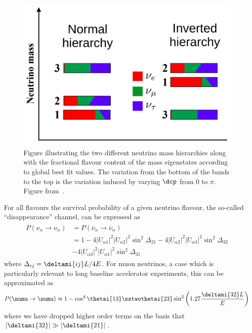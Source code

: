 \begin{figure}[h]
  \centering
  \includegraphics[width=.7\linewidth]{files/figures/theory/mh}
  \caption[Diagram of neutrino mass hierarchies.]{Figure illustrating the two different neutrino mass hierarchies along with the fractional flavour content of the mass eigenstates according to global best fit values. The variation from the bottom of the bands to the top is the variation induced by varying $\dcp$ from 0 to $\pi$. Figure from~\cite{tdrVol2}.}
  \label{fig:massHierarchy}
\end{figure}

For all flavours the survival probability of a given neutrino flavour, the so-called ``disappearance'' channel, can be expressed as~\cite{Nunokawa_2008}
\begin{align}
\begin{split}
  P(\nu_{\alpha} \rightarrow \nu_{\alpha}) &= P(\overline{\nu}_{\alpha} \rightarrow \overline{\nu}_{\alpha})\\
  &= 1 - 4|U_{\alpha 1}|^{2} |U_{\alpha 2}|^{2} \sin^{2} \Delta_{21} - 4 |U_{\alpha 2}|^{2} |U_{\alpha 3}|^{2} \sin^{2}\Delta_{32} \\ &- 4 |U_{\alpha 3}|^{2} |U_{\alpha 1}|^{2} \sin^{2} \Delta_{31}
\end{split}
\end{align}
where $\Delta_{ij}=\deltami{ij}L/4E$.
For muon neutrinos, a case which is particularly relevant to long baseline accelerator experiments, this can be approximated as
\begin{align}
  P(\numu \rightarrow \numu) \approx 1 - \cos^{4}\thetai{13} \sstwothetai{23} \sin^{2} \left( 1.27 \frac{\deltami{32}L}{E} \right)
  \label{eq:numuSurvival}
\end{align}
where we have dropped higher order terms on the basis that $|\deltami{32}| \gg |\deltami{21}|$.

